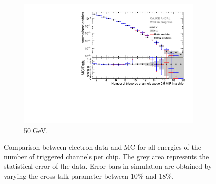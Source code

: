 \begin{figure}[htbp!]
\begin{subfigure}[t]{0.5\textwidth}
    \includegraphics[width=1\textwidth]{../Thesis_Plots/Timing/Electrons/Plots/Comparison_SimData_Electrons_nHits_50GeV.pdf}
    \caption{50 GeV.}\label{fig:elec_sim_data_nHits_50GeV}
  \end{subfigure}
  \caption{Comparison between electron data and MC for all energies of the number of triggered channels per chip. The grey area represents the statistical error of the data. Error bars in simulation are obtained by varying the cross-talk parameter between 10\% and 18\%.}
  \label{fig:sim_data_elec_nHits}
\end{figure}

